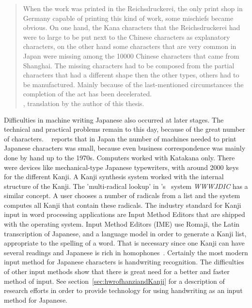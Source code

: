 \begin{quote}
When the work was printed in the Reichsdruckerei, the only print shop
in Germany capable of printing this kind of work, some mischiefs became obvious.
On one hand, the Kana characters that the Reichsdruckerei had were to large to
be put next to the Chinese characters as explanatory characters, on the other
hand some characters that are very common in Japan were missing among 
the 10000 Chinese characters that came from Shanghai.
The missing characters had to be composed from the partial characters that
had a different shape then the other types, others had to be manufactured.
Mainly because of the last-mentioned circumstances the completion of the
act has been decelerated.\\
, translation by the author of this thesis.
\end{quote}

Difficulties in machine writing Japanese also occurred at later stages. The 
technical and practical problems remain to this day, because of the great number
of characters. ~\citeyear{Foljanty1984} reports that 
in Japan the number of 
machines needed to print Japanese characters was small, because even business
correspondence was mainly done by hand up to the 1970s. Computers worked with
Katakana only. There were devices like mechanical-type Japanese typewriters,
with around 2000 keys for the different Kanji. A Kanji synthesis system worked
with the internal structure of the Kanji. The 'multi-radical lookup' in 
's~\citeyear{Breen2004} system \emph{WWWJDIC} has
a similar concept. A user chooses a number of radicals from a list and the 
system computes all Kanji that contain these radicals.
The industry standard for Kanji input in word processing applications are 
Input Method Editors that are shipped with the operating system. 
Input Method Editors (IME) use Romaji, the Latin transcription of Japanese, and 
a language model in order to generate a Kanji list, 
appropriate to the spelling of a word. 
That is necessary since one Kanji can have several readings and Japanese
is rich in homophones~. 
Certainly the most modern input method for Japanese characters is handwriting
recognition. The difficulties of other input methods show that there is 
great need for a better and faster method of input. See 
section~\ref{sec:hwrofhanziandKanji} for a description of research 
efforts in order to provide technology for using handwriting as an input method 
for Japanese.

